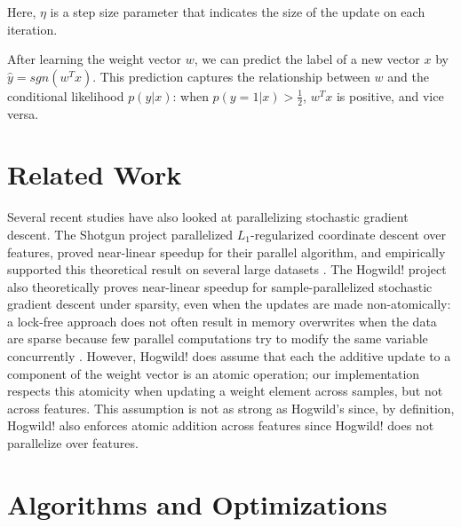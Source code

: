 \documentclass{article}
\begin{document}
Here, $\eta$ is a step size parameter that indicates the size of the update on each iteration.

After learning the weight vector $w$, we can predict the label of a new vector $x$ by $\hat{y} = sgn(w^Tx)$. This prediction captures the relationship between $w$ and the conditional likelihood $p(y|x)$: when $p(y = 1|x) > \frac{1}{2}$, $w^Tx$ is positive, and vice versa.

\section{Related Work}
Several recent studies have also looked at parallelizing stochastic gradient descent. The Shotgun project parallelized $L_1$-regularized coordinate descent over features, proved near-linear speedup for their parallel algorithm, and empirically supported this theoretical result on several large datasets \cite{shotgun2011}. The Hogwild! project also theoretically proves near-linear speedup for sample-parallelized stochastic gradient descent under sparsity, even when the updates are made non-atomically: a lock-free approach does not often result in memory overwrites when the data are sparse because few parallel computations try to modify the same variable concurrently \cite{hogwild2011}. However, Hogwild! does assume that each the additive update to a component of the weight vector is an atomic operation; our implementation respects this atomicity when updating a weight element across samples, but not across features. This assumption is not as strong as Hogwild's since, by definition, Hogwild! also enforces atomic addition across features since Hogwild! does not parallelize over features.

\section{Algorithms and Optimizations}
\end{document}
